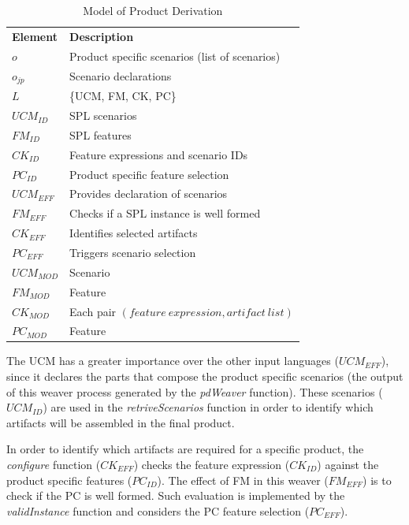 \begin{table}[htb]
\begin{center}
\caption{Model of Product Derivation} \label{tab:pd-weaver}
\begin{tabular}{p{0.6in}p{2.4in}}
   \hline\noalign{\smallskip}
  {\bf Element} & {\bf Description} \\
   \noalign{\smallskip}
   \hline
   \noalign{\smallskip}
   $o$               & Product specific scenarios (list of scenarios) \\
   $o_{jp}$        & Scenario declarations \\
   $L$               & \{UCM, FM, CK, PC\} \\
   $UCM_{ID}$ & SPL scenarios \\
   $FM_{ID}$    & SPL features \\
   $CK_{ID}$    & Feature expressions and scenario IDs\\
   $PC_{ID}$    & Product specific feature selection \\
   $UCM_{EFF}$ & Provides declaration of scenarios \\
   $FM_{EFF}$    & Checks if a SPL instance is well formed \\
   $CK_{EFF}$    & Identifies selected artifacts  \\
   $PC_{EFF}$    &Triggers scenario selection \\
   $UCM_{MOD}$ & Scenario \\
   $FM_{MOD}$   & Feature \\
   $CK_{MOD}$    & Each pair $(feature\ expression, artifact\ list)$  \\
   $PC_{MOD}$    & Feature \\
  \hline
  \end{tabular}
\end{center}
\end{table}

The UCM has a greater importance over the other input languages ($UCM_{EFF}$), since it declares the parts that compose the product specific scenarios (the
output of this weaver process generated by the \emph{pdWeaver} function). These scenarios ($UCM_{ID}$) are used in the \emph{retriveScenarios} function in order to identify which artifacts will be assembled in the final product.

In order to identify which artifacts are required for a specific product, the \emph{configure} function ($CK_{EFF}$) checks the feature expression ($CK_{ID}$) against the product specific features ($PC_{ID}$). The effect of FM in this weaver ($FM_{EFF}$) is to check if the PC is well formed. Such evaluation is implemented by the \emph{validInstance} function and considers the PC feature selection ($PC_{EFF}$).



